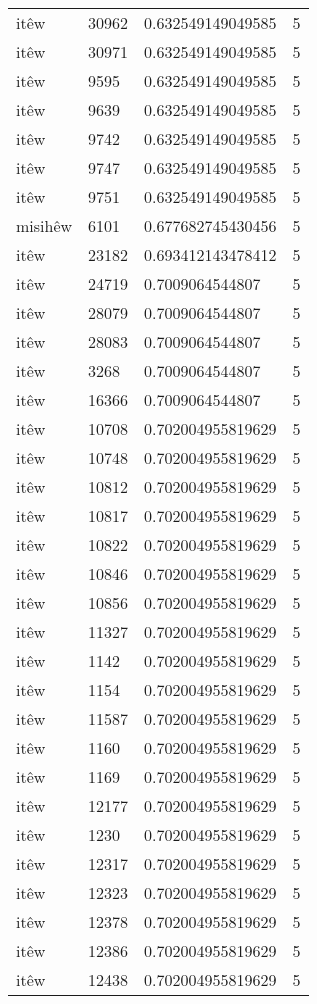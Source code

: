\begin{longtable}{llll}
itêw & 30962 & 0.632549149049585 & 5\\
itêw & 30971 & 0.632549149049585 & 5\\
itêw & 9595 & 0.632549149049585 & 5\\
itêw & 9639 & 0.632549149049585 & 5\\
itêw & 9742 & 0.632549149049585 & 5\\
itêw & 9747 & 0.632549149049585 & 5\\
itêw & 9751 & 0.632549149049585 & 5\\
misihêw & 6101 & 0.677682745430456 & 5\\
itêw & 23182 & 0.693412143478412 & 5\\
itêw & 24719 & 0.7009064544807 & 5\\
itêw & 28079 & 0.7009064544807 & 5\\
itêw & 28083 & 0.7009064544807 & 5\\
itêw & 3268 & 0.7009064544807 & 5\\
itêw & 16366 & 0.7009064544807 & 5\\
itêw & 10708 & 0.702004955819629 & 5\\
itêw & 10748 & 0.702004955819629 & 5\\
itêw & 10812 & 0.702004955819629 & 5\\
itêw & 10817 & 0.702004955819629 & 5\\
itêw & 10822 & 0.702004955819629 & 5\\
itêw & 10846 & 0.702004955819629 & 5\\
itêw & 10856 & 0.702004955819629 & 5\\
itêw & 11327 & 0.702004955819629 & 5\\
itêw & 1142 & 0.702004955819629 & 5\\
itêw & 1154 & 0.702004955819629 & 5\\
itêw & 11587 & 0.702004955819629 & 5\\
itêw & 1160 & 0.702004955819629 & 5\\
itêw & 1169 & 0.702004955819629 & 5\\
itêw & 12177 & 0.702004955819629 & 5\\
itêw & 1230 & 0.702004955819629 & 5\\
itêw & 12317 & 0.702004955819629 & 5\\
itêw & 12323 & 0.702004955819629 & 5\\
itêw & 12378 & 0.702004955819629 & 5\\
itêw & 12386 & 0.702004955819629 & 5\\
itêw & 12438 & 0.702004955819629 & 5\\

\end{longtable}

